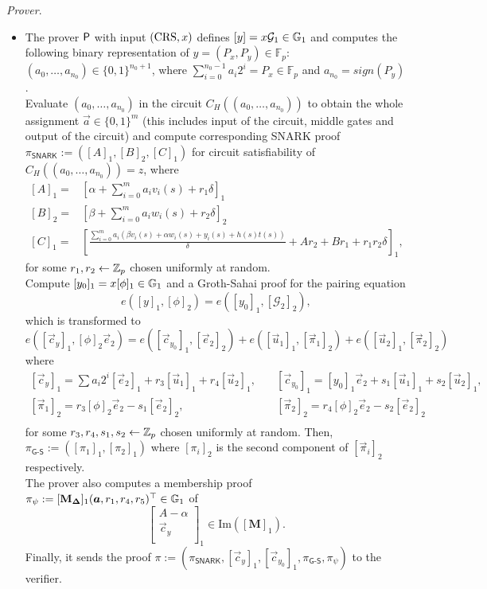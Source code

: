 \noindent \textit{Prover}. 
\begin{itemize}
	\item The prover $\mathsf{P}$ with input $(\textnormal{CRS},x)$ defines $[y]=x\mathcal{G}_1 \in \mathbb{G}_1$ and computes the following binary representation of $y= (P_x, P_y) \in \mathbb{F}_p$:
	$(a_{0},\dots,a_{n_0}) \in \{0,1\}^{n_0+1}$, where $\sum_{i=0}^{n_0-1} a_i 2^i=P_x\in \mathbb{F}_p$ and $a_{n_0} = sign(P_y)$.\\
	Evaluate $(a_{0},\dots,a_{n_0})$ in the circuit $C_H((a_{0},\dots,a_{n_0}))$ to obtain the whole assignment $\vec{a}\in \{0,1\}^m$ (this includes input of the circuit, middle gates and output of the circuit) and compute corresponding SNARK proof $\pi_{\textsf{SNARK}}:=([A]_1,[B]_2,[C]_1)$ for circuit satisfiability of $C_H((a_0,\dots,a_{n_0}))=z$, where
	\[\begin{split}
	[A]_1=&\left[\alpha + \sum_{i=0}^m a_i v_i(s) + r_1 \delta\right]_1\\
	[B]_2 = &\left[\beta + \sum_{i=0}^m a_i w_i(s) + r_2 \delta\right]_2\\
	[C]_1 = &\left[\frac{\sum_{i=0}^m a_i\left(\beta v_i(s)+\alpha w_i(s)+y_i(s)+h(s)t(s)\right)}{\delta}+Ar_2+B r_1+ r_1r_2\delta\right]_1,
	\end{split}\]
	for some $r_1,r_2 \gets \mathbb{Z}_p$ chosen uniformly at random.\\
	Compute $[y_0]_1=x[\phi]_1\in\mathbb{G}_1$ and a Groth-Sahai proof for the pairing equation
	\begin{equation}\label{GS1}
	e([y]_1,[\phi]_2)=e([y_0]_1,[\mathcal{G}_2]_2),
	\end{equation}
	which is transformed to
	\begin{equation}\label{GS2}
	e([\vec{c}_y]_1,[\phi]_2\vec{e}_2)= e([\vec{c}_{y_0}]_1,[\vec{e}_2]_2)+e([\vec{u}_1]_1,[\vec{\pi}_1]_2)+e([\vec{u}_2]_1,[\vec{\pi}_2]_2)
	\end{equation}
	where 
	$$\begin{array}{ll}	
	\left[\vec{c}_y\right]_1=\sum a_i 2^i [\vec{e}_2]_1+r_3[\vec{u}_1]_1 + r_4[\vec{u}_2]_1,\quad &[\vec{c}_{y_0}]_1 = [y_0]_1\vec{e}_2 + s_1[\vec{u}_1]_1+s_2[\vec{u}_2]_1,\\
	\left[\vec{\pi}_1\right]_2=r_3[\phi]_2\vec{e}_2-s_1[\vec{e}_2]_2,\quad &
	[\vec{\pi}_2]_2=r_4[\phi]_2\vec{e}_2-s_2[\vec{e}_2]_2\\	
	\end{array}$$
	for some $r_3,r_4,s_1,s_2\gets \mathbb{Z}_p$ chosen uniformly at random. Then,
	$\pi_{\textsf{G-S}}:=([\pi_1]_1,[\pi_2]_1)$ where $[\pi_i]_2$ is the second component of $[\vec{\pi}_i]_2$ respectively.\\
	The prover also computes a membership proof $\pi_{\psi}:=[\mathbf{M}_{\mathbf{\Delta}}]_1(\vec{a},r_1,r_4,r_5)^{\top}\in \G_1$ of 
	$$\left[\begin{array}{c}
	A-\alpha\\
	\vec{c}_y\\
	\end{array}\right]_1 \in \text{Im}\left(\left[\mathbf{M}\right]_1\right).$$	
	Finally, it sends the proof $\pi:= \left(\pi_{\textsf{SNARK}},[\vec{c}_y]_1,[\vec{c}_{y_0}]_1, \pi_{\textsf{G-S}},\pi_\psi\right)$ to the verifier.
\end{itemize}

